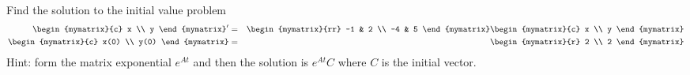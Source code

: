 \begin{enumialphparenastyle}
\begin{ex}
Find the solution to the initial value problem 
\begin{eqnarray*}
\begin{mymatrix}{c}
x \\ 
y 
\end{mymatrix} ^{\prime } &=&\begin{mymatrix}{rr}
-1 & 2 \\ 
-4 & 5 
\end{mymatrix} \begin{mymatrix}{c}
x \\ 
y 
\end{mymatrix} \\
\begin{mymatrix}{c}
x(0) \\ 
y(0) 
\end{mymatrix} &=&\begin{mymatrix}{r}
2 \\ 
2 
\end{mymatrix}
\end{eqnarray*} 
Hint: form the matrix exponential $e^{At}$ and then the solution is $e^{At}C$ where $C$ is the initial vector. 
\end{ex}

\end{enumialphparenastyle}
